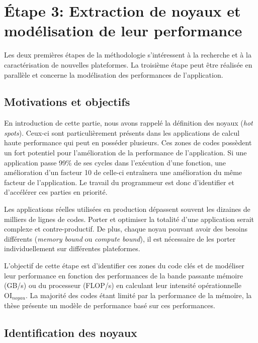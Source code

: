 \section{Étape 3: Extraction de noyaux et modélisation de leur performance} \label{sec:methodo_step3}

Les deux premières étapes de la méthodologie s'intéressent à la recherche et à la caractérisation de nouvelles plateformes. La troisième étape peut être réalisée en parallèle et concerne la modélisation des performances de l'application.


\subsection{Motivations et objectifs}


    En introduction de cette partie, nous avons rappelé la définition des noyaux (\textit{hot spots}). Ceux-ci sont particulièrement présents dans les applications de calcul haute performance qui peut en posséder plusieurs. Ces zones de codes possèdent un fort potentiel pour l'amélioration de la performance de l'application.  Si une application passe 99\% de ses cycles dans l'exécution d'une fonction, une amélioration d'un facteur 10 de celle-ci entraînera une amélioration du même facteur de l'application. Le travail du programmeur est donc d'identifier et d'accélérer ces parties en priorité.
    
    Les applications réelles utilisées en production dépassent souvent les dizaines de milliers de lignes de codes. Porter et optimiser la totalité d'une application serait complexe et contre-productif. De plus, chaque noyau pouvant avoir des besoins différents (\textit{memory bound} ou \textit{compute bound}), il est nécessaire de les porter individuellement sur différentes plateformes. 
    
    L'objectif de cette étape est d'identifier ces zones du code clés et de modéliser leur performance en fonction des performances de la bande passante mémoire (GB/s) ou du processeur (FLOP/s) en calculant leur intensité opérationnelle $\text{OI}_{noyau}$. La majorité des codes étant limité par la performance de la mémoire, la thèse présente un modèle de performance basé sur ces performances. 


\subsection{Identification des noyaux}
    
